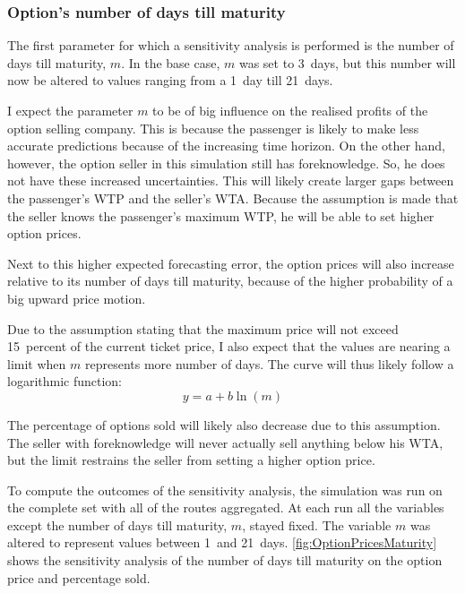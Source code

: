 \subsubsection{Option's number of days till maturity}
The first parameter for which a sensitivity analysis is performed is the number of days till maturity, $m$. In the base case, $m$ was set to 3~days, but this number will now be altered to values ranging from a 1~day till 21~days.

I expect the parameter $m$ to be of big influence on the realised profits of the option selling company. This is because the passenger is likely to make less accurate predictions because of the increasing time horizon. On the other hand, however, the option seller in this simulation still has foreknowledge. So, he does not have these increased uncertainties. This will likely create larger gaps between the passenger's WTP and the seller's WTA. Because the assumption is made that the seller knows the passenger's maximum WTP, he will be able to set higher option prices.

Next to this higher expected forecasting error, the option prices will also increase relative to its number of days till maturity, because of the higher probability of a big upward price motion.

Due to the assumption stating that the maximum price will not exceed 15~percent of the current ticket price, I also expect that the values are nearing a limit when $m$ represents more number of days. The curve will thus likely follow a logarithmic function:
$$ y = a + b \ln(m) $$

The percentage of options sold will likely also decrease due to this assumption. The seller with foreknowledge will never actually sell anything below his WTA, but the limit restrains the seller from setting a higher option price.

To compute the outcomes of the sensitivity analysis, the simulation was run on the complete set with all of the routes aggregated. At each run all the variables except the number of days till maturity, $m$, stayed fixed. The variable $m$ was altered to represent values between 1~and 21~days. \autoref{fig:OptionPricesMaturity} shows the sensitivity analysis of the number of days till maturity on the option price and percentage sold. 


